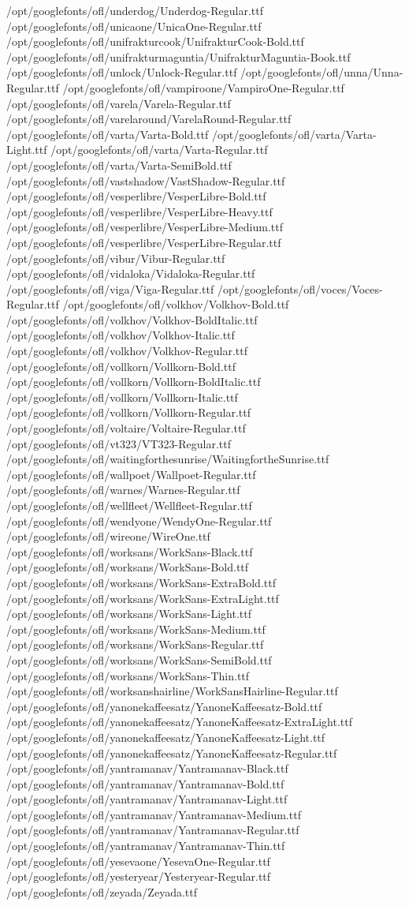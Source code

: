 /opt/googlefonts/ofl/underdog/Underdog-Regular.ttf
/opt/googlefonts/ofl/unicaone/UnicaOne-Regular.ttf
/opt/googlefonts/ofl/unifrakturcook/UnifrakturCook-Bold.ttf
/opt/googlefonts/ofl/unifrakturmaguntia/UnifrakturMaguntia-Book.ttf
/opt/googlefonts/ofl/unlock/Unlock-Regular.ttf
/opt/googlefonts/ofl/unna/Unna-Regular.ttf
/opt/googlefonts/ofl/vampiroone/VampiroOne-Regular.ttf
/opt/googlefonts/ofl/varela/Varela-Regular.ttf
/opt/googlefonts/ofl/varelaround/VarelaRound-Regular.ttf
/opt/googlefonts/ofl/varta/Varta-Bold.ttf
/opt/googlefonts/ofl/varta/Varta-Light.ttf
/opt/googlefonts/ofl/varta/Varta-Regular.ttf
/opt/googlefonts/ofl/varta/Varta-SemiBold.ttf
/opt/googlefonts/ofl/vastshadow/VastShadow-Regular.ttf
/opt/googlefonts/ofl/vesperlibre/VesperLibre-Bold.ttf
/opt/googlefonts/ofl/vesperlibre/VesperLibre-Heavy.ttf
/opt/googlefonts/ofl/vesperlibre/VesperLibre-Medium.ttf
/opt/googlefonts/ofl/vesperlibre/VesperLibre-Regular.ttf
/opt/googlefonts/ofl/vibur/Vibur-Regular.ttf
/opt/googlefonts/ofl/vidaloka/Vidaloka-Regular.ttf
/opt/googlefonts/ofl/viga/Viga-Regular.ttf
/opt/googlefonts/ofl/voces/Voces-Regular.ttf
/opt/googlefonts/ofl/volkhov/Volkhov-Bold.ttf
/opt/googlefonts/ofl/volkhov/Volkhov-BoldItalic.ttf
/opt/googlefonts/ofl/volkhov/Volkhov-Italic.ttf
/opt/googlefonts/ofl/volkhov/Volkhov-Regular.ttf
/opt/googlefonts/ofl/vollkorn/Vollkorn-Bold.ttf
/opt/googlefonts/ofl/vollkorn/Vollkorn-BoldItalic.ttf
/opt/googlefonts/ofl/vollkorn/Vollkorn-Italic.ttf
/opt/googlefonts/ofl/vollkorn/Vollkorn-Regular.ttf
/opt/googlefonts/ofl/voltaire/Voltaire-Regular.ttf
/opt/googlefonts/ofl/vt323/VT323-Regular.ttf
/opt/googlefonts/ofl/waitingforthesunrise/WaitingfortheSunrise.ttf
/opt/googlefonts/ofl/wallpoet/Wallpoet-Regular.ttf
/opt/googlefonts/ofl/warnes/Warnes-Regular.ttf
/opt/googlefonts/ofl/wellfleet/Wellfleet-Regular.ttf
/opt/googlefonts/ofl/wendyone/WendyOne-Regular.ttf
/opt/googlefonts/ofl/wireone/WireOne.ttf
/opt/googlefonts/ofl/worksans/WorkSans-Black.ttf
/opt/googlefonts/ofl/worksans/WorkSans-Bold.ttf
/opt/googlefonts/ofl/worksans/WorkSans-ExtraBold.ttf
/opt/googlefonts/ofl/worksans/WorkSans-ExtraLight.ttf
/opt/googlefonts/ofl/worksans/WorkSans-Light.ttf
/opt/googlefonts/ofl/worksans/WorkSans-Medium.ttf
/opt/googlefonts/ofl/worksans/WorkSans-Regular.ttf
/opt/googlefonts/ofl/worksans/WorkSans-SemiBold.ttf
/opt/googlefonts/ofl/worksans/WorkSans-Thin.ttf
/opt/googlefonts/ofl/worksanshairline/WorkSansHairline-Regular.ttf
/opt/googlefonts/ofl/yanonekaffeesatz/YanoneKaffeesatz-Bold.ttf
/opt/googlefonts/ofl/yanonekaffeesatz/YanoneKaffeesatz-ExtraLight.ttf
/opt/googlefonts/ofl/yanonekaffeesatz/YanoneKaffeesatz-Light.ttf
/opt/googlefonts/ofl/yanonekaffeesatz/YanoneKaffeesatz-Regular.ttf
/opt/googlefonts/ofl/yantramanav/Yantramanav-Black.ttf
/opt/googlefonts/ofl/yantramanav/Yantramanav-Bold.ttf
/opt/googlefonts/ofl/yantramanav/Yantramanav-Light.ttf
/opt/googlefonts/ofl/yantramanav/Yantramanav-Medium.ttf
/opt/googlefonts/ofl/yantramanav/Yantramanav-Regular.ttf
/opt/googlefonts/ofl/yantramanav/Yantramanav-Thin.ttf
/opt/googlefonts/ofl/yesevaone/YesevaOne-Regular.ttf
/opt/googlefonts/ofl/yesteryear/Yesteryear-Regular.ttf
/opt/googlefonts/ofl/zeyada/Zeyada.ttf

